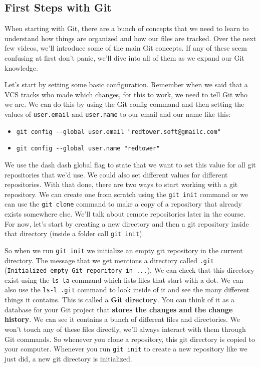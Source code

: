 	\subsection{First Steps with Git}	
	
	When starting with Git, there are a bunch of concepts that we need to learn to understand how things are organized and how our files are tracked. 
	Over the next few videos, we'll introduce some of the main Git concepts. 
	If any of these seem confusing at first don't panic, we'll dive into all of them as we expand our Git knowledge. 
	
	Let's start by setting some basic configuration. 
	Remember when we said that a VCS tracks who made which changes, for this to work, we need to tell Git who we are. 
	We can do this by using the Git config command and then setting the values of \verb|user.email| and \verb|user.name| to our email and our name like this:
	
	\begin{itemize}
	 	\item \verb|git config --global user.email "redtower.soft@gmailc.com"|
	 	\item \verb|git config --global user.name "redtower"|
	\end{itemize}
	
	We use the dash dash global flag to state that we want to set this value for all git repositories that we'd use. We could also set different values for different repositories.
	With that done, there are two ways to start working with a git repository. We can create one from scratch using the \texttt{git init} command or we can use the \texttt{git clone} command to make a copy of a repository that already exists somewhere else. We'll talk about remote repositories later in the course. For now, let's start by creating a new directory and then a git repository inside that directory (inside a folder call \texttt{git init}).
	
	So when we run \texttt{git init} we initialize an empty git repository in the current directory. 
	The message that we get mentions a directory called \verb|.git| (\texttt{Initialized empty Git reporitory in ...}). 
	We can check that this directory exist using the \texttt{ls-la} command which lists files that start with a dot. 
	We can also use the \verb|ls-l .git| command to look inside of it and see the many different things it contains. 
	This is called a \textbf{Git directory}. 
	You can think of it as a database for your Git project that\textbf{ stores the changes and the change history}. We can see it contains a bunch of different files and directories. We won't touch any of these files directly, we'll always interact with them through Git commands. So whenever you clone a repository, this git directory is copied to your computer. Whenever you run \texttt{git init} to create a new repository like we just did, a new git directory is initialized. 
	
